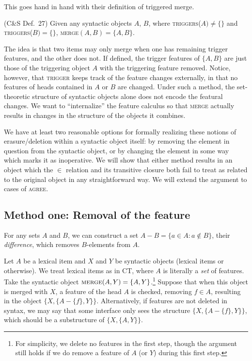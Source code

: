 \documentclass[output=paper]{langsci/langscibook}
\begin{document}
This goes hand in hand with their definition of triggered merge.

\ea\label{ex:33.22b}(C\&S Def.\ 27) Given any syntactic
objects $A$, $B$, where \textsc{triggers}($A)\neq \{\}$ and
\textsc{triggers}($B)=\{\}$, \textsc{merge}$(A,B)=\{A,B\}$.  \z

The idea is that two items may only merge when one has remaining trigger
features, and the other does not. If defined, the trigger features of $\{A,B\}$
are just those of the triggering object $A$ with the triggering feature
removed. Notice, however, that \textsc{trigger} keeps track of the feature
changes externally, in that no features of heads contained in $A$ or $B$ are
changed. Under such a method, the set-theoretic structure of syntactic objects
alone does not encode the featural changes. We want to \enquote{internalize} the
feature calculus so that \textsc{merge} actually results in changes in the
structure of the objects it combines.

We have at least two reasonable options for formally realizing these notions of
erasure/deletion within a syntactic object itself: by removing the element in
question from the syntactic object, or by changing the element in some way
which marks it as inoperative. We will show that either method results in an
object which the $\in$ relation and its transitive closure both fail to treat
as related to the original object in any straightforward way. We will extend
the argument to cases of \textsc{agree}.

\subsection{Method one: Removal of the feature}

For any sets $A$ and $B$, we can construct a set $A-B=\{a\in A:a\not\in B\}$,
their \emph{difference}, which removes $B$-elements from $A$.

Let $A$ be a lexical item and $X$ and $Y$ be syntactic objects (lexical items
or otherwise). We treat lexical items as in CT, where $A$ is literally a
\emph{set} of features. Take the syntactic object
$\textsc{merge}(A,Y)=\{A,Y\}$.\footnote{For simplicity, we delete no features
in the first step, though the argument still holds if we do remove a feature of
$A$ (or $Y$) during this first step.} Suppose that when this object is merged
with $X$, a feature of the head $A$ is checked, removing $f\in A$, resulting in
the object $\{X,\{A-\{f\},Y\}\}$. Alternatively, if features are not deleted in
syntax, we may say that some interface only sees the structure
$\{X,\{A-\{f\},Y\}\}$, which should be a substructure of $\{X,\{A,Y\}\}$.
\end{document}

